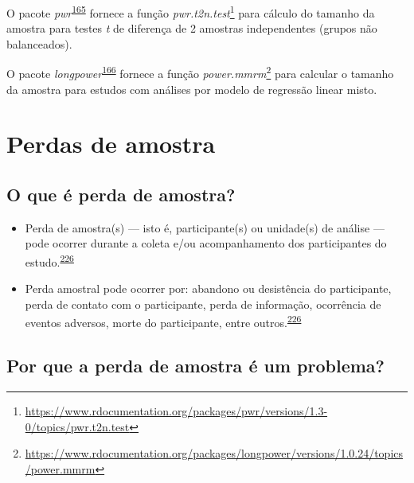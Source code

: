 \documentclass[
  a4paper,
]{book}
\renewcommand{\href}[2]{#2\footnote{\url{#1}}}
\newenvironment{infobox}[1]
  {
  \begin{itemize}
  \renewcommand{\labelitemi}{
    \raisebox{-.7\height}[0pt][0pt]{
      {\setkeys{Gin}{width=3em,keepaspectratio}
        \texttt{[image: \#1]}}
    }
  }
  \setlength{\fboxsep}{1em}
  \begin{blackbox}
  \item
  }
  {
  \end{blackbox}
  \end{itemize}
  }
\begin{document}
\begin{infobox}{images/Rlogo}
O pacote \emph{pwr}\textsuperscript{\protect\hyperlink{ref-pwr}{165}} fornece a função \href{https://www.rdocumentation.org/packages/pwr/versions/1.3-0/topics/pwr.t2n.test}{\emph{pwr.t2n.test}} para cálculo do tamanho da amostra para testes \emph{t} de diferença de 2 amostras independentes (grupos não balanceados).

\end{infobox}

\begin{infobox}{images/Rlogo}
O pacote \emph{longpower}\textsuperscript{\protect\hyperlink{ref-longpower}{166}} fornece a função \href{https://www.rdocumentation.org/packages/longpower/versions/1.0.24/topics/power.mmrm}{\emph{power.mmrm}} para calcular o tamanho da amostra para estudos com análises por modelo de regressão linear misto.

\end{infobox}

\hypertarget{perdas-de-amostra}{%
\section{Perdas de amostra}\label{perdas-de-amostra}}

\hypertarget{o-que-uxe9-perda-de-amostra}{%
\subsection{O que é perda de amostra?}\label{o-que-uxe9-perda-de-amostra}}

\begin{itemize}
\item
  Perda de amostra(s) --- isto é, participante(s) ou unidade(s) de análise --- pode ocorrer durante a coleta e/ou acompanhamento dos participantes do estudo.\textsuperscript{\protect\hyperlink{ref-rodruxedguezdeluxe1guila2014}{226}}
\item
  Perda amostral pode ocorrer por: abandono ou desistência do participante, perda de contato com o participante, perda de informação, ocorrência de eventos adversos, morte do participante, entre outros.\textsuperscript{\protect\hyperlink{ref-rodruxedguezdeluxe1guila2014}{226}}
\end{itemize}

\hypertarget{por-que-a-perda-de-amostra-uxe9-um-problema}{%
\subsection{Por que a perda de amostra é um problema?}\label{por-que-a-perda-de-amostra-uxe9-um-problema}}
\end{document}
